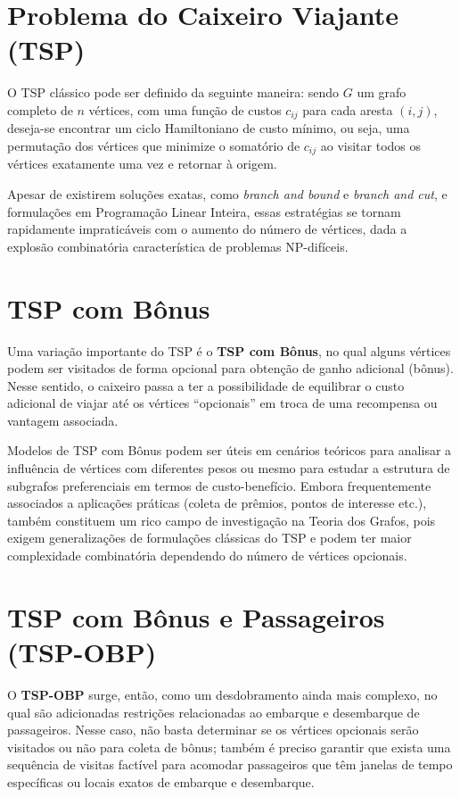 \documentclass[12pt, a4paper]{report}
\begin{document}
\section{Problema do Caixeiro Viajante (TSP)}
O TSP clássico pode ser definido da seguinte maneira: sendo $G$ um grafo completo de $n$ vértices, com uma função de custos $c_{ij}$ para cada aresta $(i, j)$, deseja-se encontrar um ciclo Hamiltoniano de custo mínimo, ou seja, uma permutação dos vértices que minimize o somatório de $c_{ij}$ ao visitar todos os vértices exatamente uma vez e retornar à origem.

Apesar de existirem soluções exatas, como \textit{branch and bound} e \textit{branch and cut}, e formulações em Programação Linear Inteira, essas estratégias se tornam rapidamente impraticáveis com o aumento do número de vértices, dada a explosão combinatória característica de problemas NP-difíceis.

\section{TSP com Bônus}
Uma variação importante do TSP é o \textbf{TSP com Bônus}, no qual alguns vértices podem ser visitados de forma opcional para obtenção de ganho adicional (bônus). Nesse sentido, o caixeiro passa a ter a possibilidade de equilibrar o custo adicional de viajar até os vértices “opcionais” em troca de uma recompensa ou vantagem associada. 

Modelos de TSP com Bônus podem ser úteis em cenários teóricos para analisar a influência de vértices com diferentes pesos ou mesmo para estudar a estrutura de subgrafos preferenciais em termos de custo-benefício. Embora frequentemente associados a aplicações práticas (coleta de prêmios, pontos de interesse etc.), também constituem um rico campo de investigação na Teoria dos Grafos, pois exigem generalizações de formulações clássicas do TSP e podem ter maior complexidade combinatória dependendo do número de vértices opcionais.

\section{TSP com Bônus e Passageiros (TSP-OBP)}
O \textbf{TSP-OBP} surge, então, como um desdobramento ainda mais complexo, no qual são adicionadas restrições relacionadas ao embarque e desembarque de passageiros. Nesse caso, não basta determinar se os vértices opcionais serão visitados ou não para coleta de bônus; também é preciso garantir que exista uma sequência de visitas factível para acomodar passageiros que têm janelas de tempo específicas ou locais exatos de embarque e desembarque.
\end{document}
